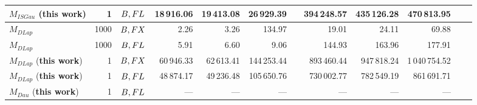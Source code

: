\begin{table}
{\begin{tabular}{ l r c r r r r r r r r r}
            \midrule
            $M_{ISGau}$ (\textbf{this work})                     & 1       & $B,FL$ & 18\,916.06              & 19\,413.08 & 26\,929.39              &  & 394\,248.57 & 435\,126.28 & 470\,813.95    \\
            \midrule
            $M_{DLap}$~\cite{eigner2014differentially}           & 1000    & $B,FX$ & 2.26                    & 3.26       & 134.97                  &  & 19.01       & 24.11       & 69.88          \\
            $M_{DLap}$~\cite{eigner2014differentially}           & 1000    & $B,FL$ & 5.91                    & 6.60       & 9.06                    &  & 144.93      & 163.96      & 177.91         \\
            $M_{DLap}$ (\textbf{this work})                      & 1       & $B,FX$ & 60\,946.33              & 62\,613.41 & 144\,253.44             &  & 893\,460.44 & 947\,818.24 & 1\,040\,754.52 \\
            $M_{DLap}$ (\textbf{this work})                      & 1       & $B,FL$ & 48\,874.17              & 49\,236.48 & 105\,650.76             &  & 730\,002.77 & 782\,549.19 & 861\,691.71    \\
            \midrule
            $M_{Dau}$ (\textbf{this work})                       & 1       & $B,FL$ & ---                     & ---        & ---                     &  & ---         & ---         & ---            \\
            \bottomrule
        \end{tabular}
    }
\end{table}
\FloatBarrier














